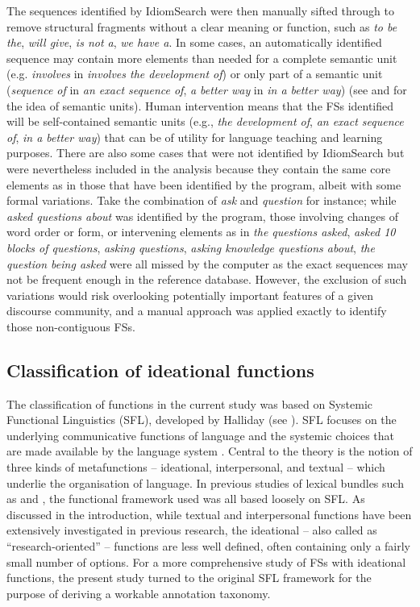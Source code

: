 \documentclass[output=paper]{langscibook}
\begin{document}
The sequences identified by IdiomSearch were then manually sifted through to remove structural fragments without a clear meaning or function, such as \textit{to be the}, \textit{will give}, \textit{is not a}, \textit{we have a}. In some cases, an automatically identified sequence may contain more elements than needed for a complete semantic unit (e.g. \textit{involves} in \textit{involves the development of}) or only part of a semantic unit (\textit{sequence of} in \textit{an exact sequence of}, \textit{a better way} in \textit{in a better way}) (see \citealt{MartinezSchmitt2012} and \citealt{Buerki2016} for the idea of semantic units). Human intervention means that the FSs identified will be self-contained semantic units (e.g., \textit{the development of}, \textit{an exact sequence of}, \textit{in a better way}) that can be of utility for language teaching and learning purposes. There are also some cases that were not identified by IdiomSearch but were nevertheless included in the analysis because they contain the same core elements as in those that have been identified by the program, albeit with some formal variations. Take the combination of \textit{ask} and \textit{question} for instance; while \textit{asked questions about} was identified by the program, those involving changes of word order or form, or intervening elements as in \textit{the questions asked}, \textit{asked 10 blocks of questions}, \textit{asking questions}, \textit{asking knowledge questions about}, \textit{the question being asked} were all missed by the computer as the exact sequences may not be frequent enough in the reference database. However, the exclusion of such variations would risk overlooking potentially important features of a given discourse community, and a manual approach was applied exactly to identify those non-contiguous FSs.

\subsection{Classification of ideational functions}\label{sec:wang:2.3}

The classification of functions in the current study was based on Systemic Functional Linguistics (SFL), developed by Halliday (see \citealt{Halliday2014}). SFL focuses on the underlying communicative functions of language and the systemic choices that are made available by the language system \citep{Gledhill2011}. Central to the theory is the notion of three kinds of metafunctions – ideational, interpersonal, and textual – which underlie the organisation of language. In previous studies of lexical bundles such as \citet{Hyland2008} and \citet{BiberEtAl2004}, the functional framework used was all based loosely on SFL. As discussed in the introduction, while textual and interpersonal functions have been extensively investigated in previous research, the ideational – also called as ``research-oriented'' – functions are less well defined, often containing only a fairly small number of options. For a more comprehensive study of FSs with ideational functions, the present study turned to the original SFL framework for the purpose of deriving a workable annotation taxonomy.
\end{document}
